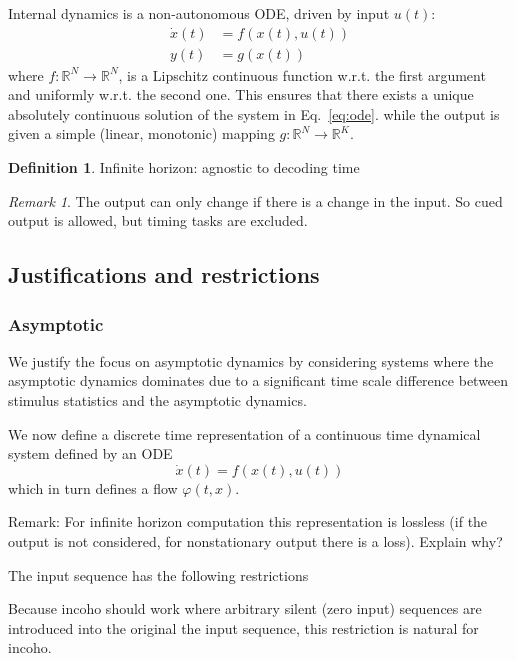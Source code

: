 \documentclass{scrartcl}
\theoremstyle{definition}
\newtheorem{definition}{Definition}
\theoremstyle{remark}
\newtheorem{remark}{Remark}
\newcommand{\reals}{\mathbb{R}}
\begin{document}
Internal dynamics is a non-autonomous ODE, driven by input $u(t)$:
\begin{align}
\dot x(t) &= f(x(t),u(t))\label{eq:ode}\\
y(t) &= g(x(t))	\label{eq:output}
\end{align}
where $f:\reals^N\rightarrow\reals^N$, is a Lipschitz continuous function w.r.t. the first argument and uniformly w.r.t. the second one. This ensures that there exists a unique absolutely continuous solution of the system in Eq.~\ref{eq:ode}.
while the output is given a simple (linear, monotonic) mapping $g:\reals^N\rightarrow\reals^K$.


\begin{definition}
Infinite horizon: agnostic to decoding time
\end{definition}







\begin{remark}
The output can only change if there is a change in the input. 
So cued output is allowed, but timing tasks are excluded.
\end{remark}

\subsection{Justifications and restrictions}\label{sec:jar}
\subsubsection{Asymptotic}
We justify the focus on asymptotic dynamics by considering systems where the asymptotic dynamics dominates due to a significant time scale difference between stimulus statistics and the asymptotic dynamics.


We now define a discrete time representation of a continuous time dynamical system defined by an ODE
\begin{equation}\label{eq:inputdriven}
\dot x(t) = f(x(t), u(t))
\end{equation}
which in turn defines a flow $\varphi(t,x)$.

Remark: For infinite horizon computation this representation is lossless (if the output is not considered, for nonstationary output there is a loss).
Explain why?

The input sequence has the following restrictions

Because incoho should work where arbitrary silent (zero input) sequences are introduced into the original the input sequence, this restriction is natural for incoho.
\end{document}
